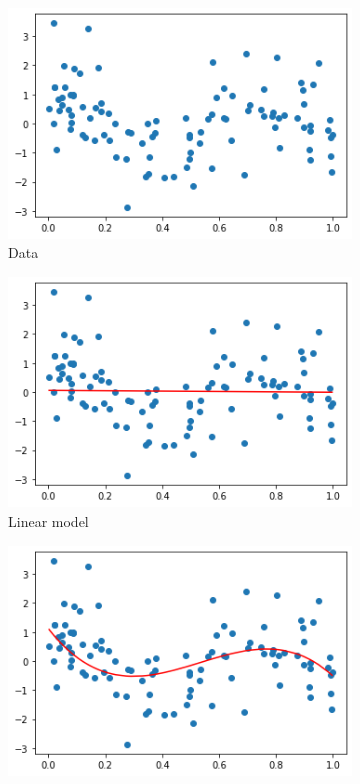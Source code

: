 \documentclass{article}
\begin{document}
\begin{enumerate}
    \begin{figure}[h!]
        \begin{subfigure}{.5\textwidth}
            \centering
            \includegraphics[width=.8\linewidth]{images/data.png}
            \caption{Data}
            \label{data}
        \end{subfigure}
        \hfill
        \begin{subfigure}{.5\textwidth}
            \centering
            \includegraphics[width=.8\linewidth]{images/data-1.png}
            \caption{Linear model}
            \label{linear}
        \end{subfigure}
        \hfill
        \begin{subfigure}{.5\textwidth}
            \centering
            \includegraphics[width=.8\linewidth]{images/data-3.png}

\end{subfigure}
\end{figure}
\end{enumerate}
\end{document}
